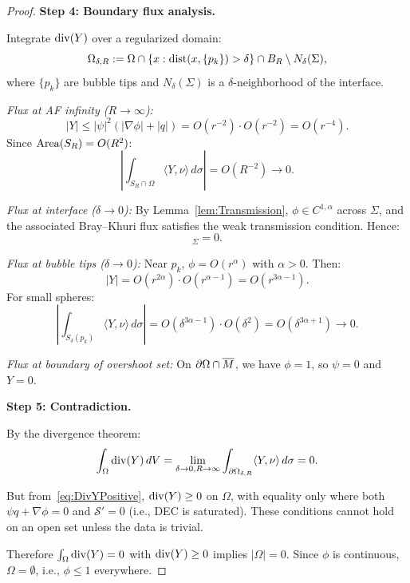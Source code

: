 \begin{proof}
\textbf{Step 4: Boundary flux analysis.}

Integrate $\mathrm{div}(Y)$ over a regularized domain:
\begin{equation}
    \Omega_{\delta, R} := \Omega \cap \{x : \mathrm{dist}(x, \{p_k\}) > \delta\} \cap B_R \setminus N_\delta(\Sigma),
\end{equation}
where $\{p_k\}$ are bubble tips and $N_\delta(\Sigma)$ is a $\delta$-neighborhood of the interface.

\textit{Flux at AF infinity ($R \to \infty$):}
\begin{equation}
    |Y| \le |\psi|^2(|\nabla \phi| + |q|) = O(r^{-2}) \cdot O(r^{-2}) = O(r^{-4}).
\end{equation}
Since $\operatorname{Area}(S_R) = O(R^2)$:
\begin{equation}
    \left|\int_{S_R \cap \Omega} \langle Y, \nu \rangle \, d\sigma \right| = O(R^{-2}) \to 0.
\end{equation}

\textit{Flux at interface ($\delta \to 0$):} By Lemma~\ref{lem:Transmission}, $\phi \in C^{1,\alpha}$ across $\Sigma$, and the associated Bray--Khuri flux satisfies the weak transmission condition. Hence:
\begin{equation}
    [Y \cdot \nu]_\Sigma = 0.
\end{equation}

\textit{Flux at bubble tips ($\delta \to 0$):} Near $p_k$, $\phi = O(r^\alpha)$ with $\alpha > 0$. Then:
\begin{equation}
    |Y| = O(r^{2\alpha}) \cdot O(r^{\alpha-1}) = O(r^{3\alpha - 1}).
\end{equation}
For small spheres:
\begin{equation}
    \left|\int_{S_\delta(p_k)} \langle Y, \nu \rangle \, d\sigma \right| = O(\delta^{3\alpha - 1}) \cdot O(\delta^2) = O(\delta^{3\alpha + 1}) \to 0.
\end{equation}

\textit{Flux at boundary of overshoot set:} On $\partial \Omega \cap \overline{M}$, we have $\phi = 1$, so $\psi = 0$ and $Y = 0$.

\textbf{Step 5: Contradiction.}

By the divergence theorem:
\begin{equation}
    \int_{\Omega} \mathrm{div}(Y) \, dV = \lim_{\delta \to 0, R \to \infty} \int_{\partial \Omega_{\delta,R}} \langle Y, \nu \rangle \, d\sigma = 0.
\end{equation}

But from~\eqref{eq:DivYPositive}, $\mathrm{div}(Y) \ge 0$ on $\Omega$, with equality only where both $\psi q + \nabla \phi = 0$ and $\mathcal{S}' = 0$ (i.e., DEC is saturated). These conditions cannot hold on an open set unless the data is trivial.

Therefore $\int_\Omega \mathrm{div}(Y) = 0$ with $\mathrm{div}(Y) \ge 0$ implies $|\Omega| = 0$. Since $\phi$ is continuous, $\Omega = \emptyset$, i.e., $\phi \le 1$ everywhere.
\end{proof}

